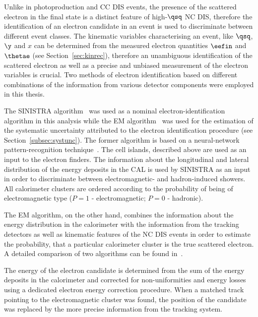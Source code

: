 Unlike in photoproduction and CC DIS events, the presence of the scattered electron in the final state is a distinct feature of high-$\qsq$ NC DIS, therefore the identification of an electron candidate in an event is used to discriminate between different event classes. The kinematic variables characterising an event, like $\qsq$, $\y$ and $x$ can be determined from the measured electron quantities $\eefin$ and $\thetae$ (see Section~\ref{sec:kinrec}), therefore an unambiguous identification of the scattered electron as well as a precise and unbiased measurement of the electron variables is crucial. Two methods of electron identification based on different combinations of the information from various detector components were employed in this thesis. 

The SINISTRA algorithm~\cite{nim:a365:508} was used as a nominal electron-identification algorithm in this analysis while the EM algorithm~\cite{epj:c11:427,upub:Straub:url} was used for the estimation of the systematic uncertainty attributed to the electron identification procedure (see Section~\ref{subsec:systunc}). The former algorithm is based on a neural-network pattern-recognition technique~\cite{desy:95:54}. The cell islands, described above are used as an input to the electron finders. The information about the longitudinal and lateral distribution of the energy deposits in the CAL is used by SINISTRA as an input in order to discriminate between electromagnetic- and hadron-induced showers. All calorimeter clusters are ordered according to the probability of being of electromagnetic type ($P=1$ - electromagnetic; $P=0$ - hadronic). 

The EM algorithm, on the other hand, combines the information about the energy distribution in the calorimeter with the information from the tracking detectors as well as kinematic features of the NC DIS events in order to estimate the probability, that a particular calorimeter cluster is the true scattered electron. A detailed comparison of two algorithms can be found in~\cite{upub:schlenstedt:zn9977}.

The energy of the electron candidate is determined from the sum of the energy deposits in the calorimeter and corrected for non-uniformities and energy losses using a dedicated electron energy correction procedure. When a matched track pointing to the electromagnetic cluster was found, the position of the candidate was replaced by the more precise information from the tracking system.